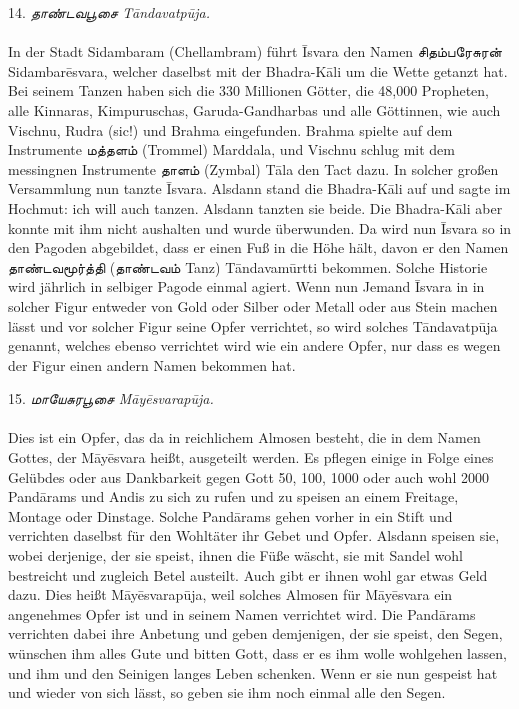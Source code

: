 \documentclass{article}
\newcommand{\TamilText}[1]{\texttamil{#1}}
\newcommand{\tam}[1]{\TamilText{#1}}
\begin{document}
\begin{center}
14. \emph{\tam{தாண்டவபூசை} T\={a}ndavatp\={u}ja.}
\end{center}
\paragraph{}
In der Stadt Sidambaram (Chellambram) führt \={I}svara den Namen \tam{சிதம்பரேசுரன்} Sidambar\={e}svara, welcher daselbst mit der Bhadra-K\={a}li um die Wette getanzt hat. Bei seinem Tanzen haben sich die 330 Millionen Götter, die 48,000 Propheten, alle Kinnaras, Kimpuruschas, Garuda-Gandharbas und alle Göttinnen, wie auch Vischnu, Rudra (sic!) und Brahma eingefunden. Brahma spielte auf dem Instrumente \tam{மத்தளம்} (Trommel) Marddala, und Vischnu schlug mit dem messingnen Instrumente \tam{தாளம்} (Zymbal) T\={a}la den Tact dazu. In solcher großen Versammlung nun tanzte \={I}svara. Alsdann stand die Bhadra-K\={a}li auf und sagte im Hochmut: ich will auch tanzen. Alsdann tanzten sie beide. Die Bhadra-K\={a}li aber konnte mit ihm nicht aushalten und wurde überwunden. Da wird nun \={I}svara so in den Pagoden abgebildet, dass er einen Fuß in die Höhe hält, davon er den Namen \tam{தாண்டவமூர்த்தி} (\tam{தாண்டவம்} Tanz) T\={a}ndavam\={u}rtti bekommen. Solche Historie wird jährlich in selbiger Pagode einmal agiert. Wenn nun Jemand \={I}svara in in solcher Figur entweder von Gold oder Silber oder Metall oder aus Stein machen lässt und vor solcher Figur seine Opfer verrichtet, so wird solches T\={a}ndavatp\={u}ja genannt, welches ebenso verrichtet wird wie ein andere Opfer, nur dass es wegen der Figur einen andern Namen bekommen hat.

\begin{center}
15. \emph{\tam{மாயேசுரபூசை} M\={a}y\={e}svarap\={u}ja.}
\end{center}
\paragraph{}
Dies ist ein Opfer, das da in reichlichem Almosen besteht, die in dem Namen Gottes, der M\={a}y\={e}svara heißt, ausgeteilt werden. Es pflegen einige in Folge eines Gelübdes oder aus Dankbarkeit gegen Gott 50, 100, 1000 oder auch wohl 2000 Pand\={a}rams und Andis zu sich zu rufen und zu speisen an einem Freitage, Montage oder Dinstage. Solche Pand\={a}rams gehen vorher in ein Stift und verrichten daselbst für den Wohltäter ihr Gebet und Opfer. Alsdann speisen sie, wobei derjenige, der sie speist, ihnen die Füße wäscht, sie mit Sandel wohl bestreicht und zugleich Betel austeilt. Auch gibt er ihnen wohl gar etwas Geld dazu. Dies heißt M\={a}y\={e}svarap\={u}ja, weil solches Almosen für M\={a}y\={e}svara ein angenehmes Opfer ist und in seinem Namen verrichtet wird. Die Pand\={a}rams verrichten dabei ihre Anbetung und geben demjenigen, der sie speist, den Segen, wünschen ihm alles Gute und bitten Gott, dass er es ihm wolle wohlgehen lassen, und ihm und den Seinigen langes Leben schenken. Wenn er sie nun gespeist hat und wieder von sich lässt, so geben sie ihm noch einmal alle den Segen.
\end{document}
